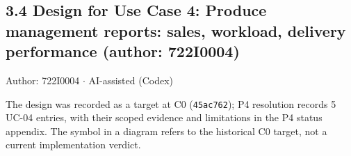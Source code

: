 \subsection*{3.4 Design for Use Case 4: Produce management reports: sales, workload, delivery performance (author: 722I0004)}
Author: 722I0004 \ensuremath{\cdot} AI-assisted (Codex)

The design was recorded as a target at C0 (\texttt{45ac762}); P4 resolution records 5 UC-04 entries, with their scoped evidence and limitations in the P4 status appendix. The \textdagger{} symbol in a diagram refers to the historical C0 target, not a current implementation verdict.
